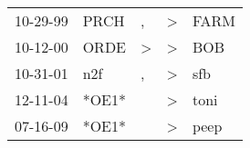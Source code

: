 \begin{supertabular}{lllll}
 10-29-99 &   PRCH &             , &  \textgreater &  FARM \\
 10-12-00 &   ORDE &  \textgreater &  \textgreater &   BOB \\
 10-31-01 &    n2f &             , &  \textgreater &   sfb \\
 12-11-04 &  *OE1* &               &  \textgreater &  toni \\
 07-16-09 &  *OE1* &               &  \textgreater &  peep \\
\end{supertabular}

